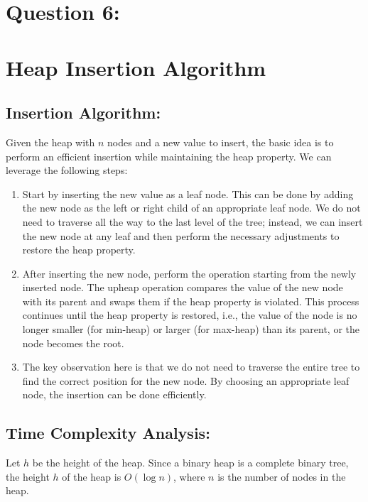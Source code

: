 \documentclass{article}
\begin{document}
\pagebreak
\section*{Question 6:}
\section*{Heap Insertion Algorithm}

\subsection*{Insertion Algorithm:}

Given the heap with \( n \) nodes and a new value to insert, the basic idea is to perform an efficient insertion while maintaining the heap property. We can leverage the following steps:

\begin{enumerate}
    \item Start by inserting the new value as a leaf node. This can be done by adding the new node as the left or right child of an appropriate leaf node. We do not need to traverse all the way to the last level of the tree; instead, we can insert the new node at any leaf and then perform the necessary adjustments to restore the heap property.
    \item After inserting the new node, perform the  operation starting from the newly inserted node. The upheap operation compares the value of the new node with its parent and swaps them if the heap property is violated. This process continues until the heap property is restored, i.e., the value of the node is no longer smaller (for min-heap) or larger (for max-heap) than its parent, or the node becomes the root.
    \item The key observation here is that we do not need to traverse the entire tree to find the correct position for the new node. By choosing an appropriate leaf node, the insertion can be done efficiently.
\end{enumerate}

\subsection*{Time Complexity Analysis:}

Let \( h \) be the height of the heap. Since a binary heap is a complete binary tree, the height \( h \) of the heap is \( O(\log n) \), where \( n \) is the number of nodes in the heap.
\end{document}

